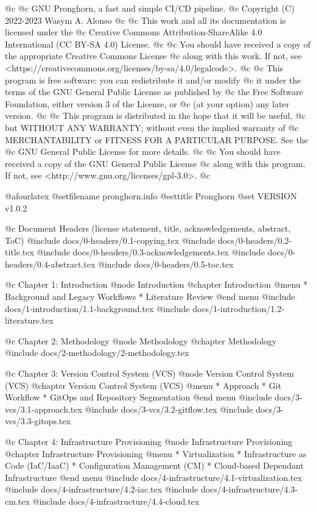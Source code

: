 


@c
@c GNU Pronghorn, a fast and simple CI/CD pipeline.
@c Copyright (C) 2022-2023 Wasym A. Alonso
@c
@c This work and all its documentation is licensed under the
@c Creative Commons Attribution-ShareAlike 4.0 International (CC BY-SA 4.0) License.
@c
@c You should have received a copy of the appropriate Creative Commons License
@c along with this work. If not, see <https://creativecommons.org/licenses/by-sa/4.0/legalcode>.
@c
@c This program is free software: you can redistribute it and/or modify
@c it under the terms of the GNU General Public License as published by
@c the Free Software Foundation, either version 3 of the License, or
@c (at your option) any later version.
@c
@c This program is distributed in the hope that it will be useful,
@c but WITHOUT ANY WARRANTY; without even the implied warranty of
@c MERCHANTABILITY or FITNESS FOR A PARTICULAR PURPOSE. See the
@c GNU General Public License for more details.
@c
@c You should have received a copy of the GNU General Public License
@c along with this program. If not, see <http://www.gnu.org/licenses/gpl-3.0>.
@c


@afourlatex
@setfilename pronghorn.info
@settitle Pronghorn
@set VERSION v1.0.2


@c Document Headers (license statement, title, acknowledgements, abstract, ToC)
@include docs/0-headers/0.1-copying.tex
@include docs/0-headers/0.2-title.tex
@include docs/0-headers/0.3-acknowledgements.tex
@include docs/0-headers/0.4-abstract.tex
@include docs/0-headers/0.5-toc.tex


@c Chapter 1: Introduction
@node Introduction
@chapter Introduction
@menu
* Background and Legacy Workflows
* Literature Review
@end menu
@include docs/1-introduction/1.1-background.tex
@include docs/1-introduction/1.2-literature.tex

@c Chapter 2: Methodology
@node Methodology
@chapter Methodology
@include docs/2-methodology/2-methodology.tex

@c Chapter 3: Version Control System (VCS)
@node Version Control System (VCS)
@chapter Version Control System (VCS)
@menu
* Approach
* Git Workflow
* GitOps and Repository Segmentation
@end menu
@include docs/3-vcs/3.1-approach.tex
@include docs/3-vcs/3.2-gitflow.tex
@include docs/3-vcs/3.3-gitops.tex

@c Chapter 4: Infrastructure Provisioning
@node Infrastructure Provisioning
@chapter Infrastructure Provisioning
@menu
* Virtualization
* Infrastructure as Code (IaC/IaaC)
* Configuration Management (CM)
* Cloud-based Dependant Infrastructure
@end menu
@include docs/4-infrastructure/4.1-virtualization.tex
@include docs/4-infrastructure/4.2-iac.tex
@include docs/4-infrastructure/4.3-cm.tex
@include docs/4-infrastructure/4.4-cloud.tex

